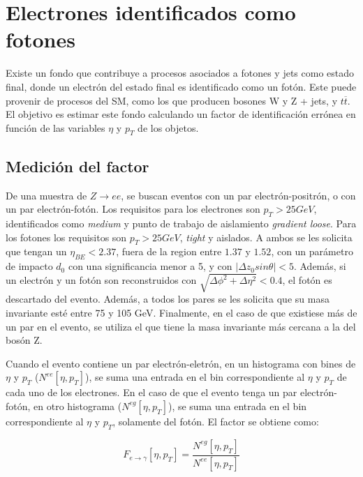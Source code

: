 \chapter{Electrones identificados como fotones}

Existe un fondo que contribuye a procesos asociados a fotones y jets como estado final, donde un electrón del estado final es identificado como un fotón. Este puede provenir de procesos del SM, como los que producen bosones W y Z + jets, y $t \overline{t}$. El objetivo es estimar este fondo calculando un factor de identificación errónea en función de las variables $\eta$ y $p_{T}$ de los objetos.

\section{Medición del factor}

De una muestra de $Z\rightarrow ee$, se buscan eventos con un par electrón-positrón, o con un par electrón-fotón. Los requisitos para los electrones son $p_{T} > 25GeV$, identificados como \textit{medium} y punto de trabajo de aislamiento \textit{gradient loose}. Para los fotones los requisitos son $p_{T} > 25GeV$, \textit{tight} y aislados. A ambos se les solicita que tengan un $\eta_{BE}<2.37$, fuera de la region entre $1.37$ y $1.52$, con un parámetro de impacto $d_{0}$ con una significancia menor a 5, y con $|\Delta z_{0}sin\theta|<5$. Además, si un electrón y un fotón son reconstruidos con $\sqrt{\Delta\phi^{2}+\Delta\eta^{2}}<0.4$, el fotón es descartado del evento. Además, a todos los pares se les solicita que su masa invariante esté entre 75 y 105 GeV. Finalmente, en el caso de que existiese más de un par en el evento, se utiliza el que tiene la masa invariante más cercana a la del bosón Z.

Cuando el evento contiene un par electrón-eletrón, en un histograma con bines de $\eta$ y $p_{T}$ ($N^{ee}[\eta , p_{T}]$), se suma una entrada en el bin correspondiente al $\eta$ y $p_{T}$ de cada uno de los electrones. En el caso de que el evento tenga un par electrón-fotón, en otro histograma ($N^{eg}[\eta , p_{T}]$), se suma una entrada en el bin correspondiente al $\eta$ y $p_{T}$, solamente del fotón. El factor se obtiene como:

\begin{equation}
F_{e\rightarrow\gamma}[\eta , p_{T}]=\frac{N^{eg}[\eta , p_{T}]}{N^{ee}[\eta , p_{T}]}
\end{equation}


